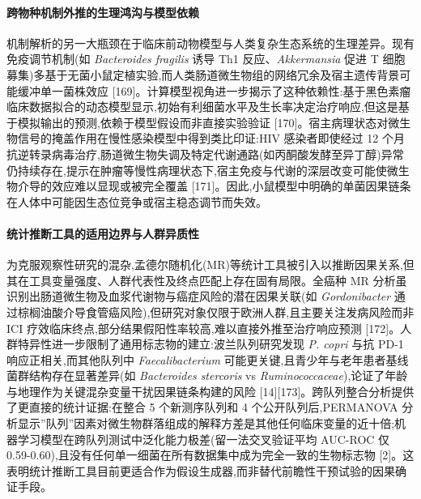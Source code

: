 \paragraph{跨物种机制外推的生理鸿沟与模型依赖}\label{ux8de8ux7269ux79cdux673aux5236ux5916ux63a8ux7684ux751fux7406ux9e3fux6c9fux4e0eux6a21ux578bux4f9dux8d56}

机制解析的另一大瓶颈在于临床前动物模型与人类复杂生态系统的生理差异。现有免疫调节机制(如 \emph{Bacteroides fragilis} 诱导 Th1 反应、\emph{Akkermansia} 促进 T 细胞募集)多基于无菌小鼠定植实验,而人类肠道微生物组的网络冗余及宿主遗传背景可能缓冲单一菌株效应 {[}169{]}。计算模型视角进一步揭示了这种依赖性:基于黑色素瘤临床数据拟合的动态模型显示,初始有利细菌水平及生长率决定治疗响应,但这是基于模拟输出的预测,依赖于模型假设而非直接实验验证 {[}170{]}。宿主病理状态对微生物信号的掩盖作用在慢性感染模型中得到类比印证:HIV 感染者即使经过 12 个月抗逆转录病毒治疗,肠道微生物失调及特定代谢通路(如丙酮酸发酵至异丁醇)异常仍持续存在,提示在肿瘤等慢性病理状态下,宿主免疫与代谢的深层改变可能使微生物介导的效应难以显现或被完全覆盖 {[}171{]}。因此,小鼠模型中明确的单菌因果链条在人体中可能因生态位竞争或宿主稳态调节而失效。

\paragraph{统计推断工具的适用边界与人群异质性}\label{ux7edfux8ba1ux63a8ux65adux5de5ux5177ux7684ux9002ux7528ux8fb9ux754cux4e0eux4ebaux7fa4ux5f02ux8d28ux6027}

为克服观察性研究的混杂,孟德尔随机化(MR)等统计工具被引入以推断因果关系,但其在工具变量强度、人群代表性及终点匹配上存在固有局限。全癌种 MR 分析虽识别出肠道微生物及血浆代谢物与癌症风险的潜在因果关联(如 \emph{Gordonibacter} 通过棕榈油酸介导食管癌风险),但研究对象仅限于欧洲人群,且主要关注发病风险而非 ICI 疗效临床终点,部分结果假阳性率较高,难以直接外推至治疗响应预测 {[}172{]}。人群特异性进一步限制了通用标志物的建立:波兰队列研究发现 \emph{P. copri} 与抗 PD-1 响应正相关,而其他队列中 \emph{Faecalibacterium} 可能更关键,且青少年与老年患者基线菌群结构存在显著差异(如 \emph{Bacteroides stercoris} vs \emph{Ruminococcaceae}),论证了年龄与地理作为关键混杂变量干扰因果链条构建的风险 {[}14{]}{[}173{]}。跨队列整合分析提供了更直接的统计证据:在整合 5 个新测序队列和 4 个公开队列后,PERMANOVA 分析显示''队列''因素对微生物群落组成的解释方差是其他任何临床变量的近十倍;机器学习模型在跨队列测试中泛化能力极差(留一法交叉验证平均 AUC-ROC 仅 0.59-0.60),且没有任何单一细菌在所有数据集中成为完全一致的生物标志物 {[}2{]}。这表明统计推断工具目前更适合作为假设生成器,而非替代前瞻性干预试验的因果确证手段。


